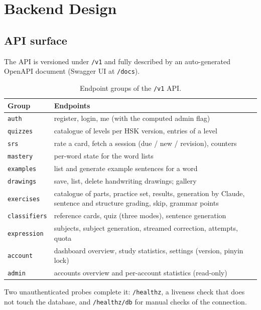 \documentclass[11pt,a4paper]{article}
\begin{document}
\section{Backend Design}

\subsection{API surface}

The API is versioned under \texttt{/v1} and fully described by an
auto-generated OpenAPI document (Swagger UI at \texttt{/docs}).

\begin{table}[h]
\centering\small
\begin{tabularx}{\linewidth}{@{}lL@{}}
\toprule
\textbf{Group} & \textbf{Endpoints} \\
\midrule
\texttt{auth}        & register, login, me (with the computed admin flag) \\
\texttt{quizzes}     & catalogue of levels per HSK version, entries of a level \\
\texttt{srs}         & rate a card, fetch a session (due / new / revision), counters \\
\texttt{mastery}     & per-word state for the word lists \\
\texttt{examples}    & list and generate example sentences for a word \\
\texttt{drawings}    & save, list, delete handwriting drawings; gallery \\
\texttt{exercises}   & catalogue of parts, practice set, results, generation by Claude,
                       sentence and structure grading, skip, grammar points \\
\texttt{classifiers} & reference cards, quiz (three modes), sentence generation \\
\texttt{expression}  & subjects, subject generation, streamed correction, attempts, quota \\
\texttt{account}     & dashboard overview, study statistics, settings (version, pinyin lock) \\
\texttt{admin}       & accounts overview and per-account statistics (read-only) \\
\bottomrule
\end{tabularx}
\caption{Endpoint groups of the \texttt{/v1} API.}
\end{table}

\noindent Two unauthenticated probes complete it: \texttt{/healthz}, a liveness
check that does not touch the database, and \texttt{/healthz/db} for manual
checks of the connection.
\end{document}
